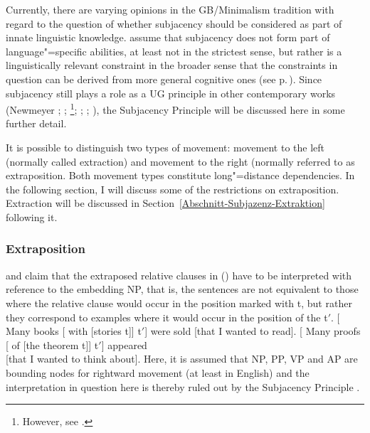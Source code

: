 Currently, there are varying opinions in the GB/Minimalism tradition with regard to the question of whether subjacency should be considered as part of innate linguistic knowledge.
\citet*{HCF2002a} assume that subjacency does not form part of language"=specific abilities, at least not in the strictest sense, but rather is a linguistically relevant constraint
in the broader sense that the constraints in question can be derived from more general cognitive ones (see
p.\,\pageref{Seite-Subjazenz-Performanz}). Since subjacency still plays a role as a UG principle in other contemporary works (Newmeyer \citeyear[, 74--75]{Newmeyer2005a};
\citeyear[]{Newmeyer2004b}; 
\citealp{Baltin2006a}\footnote{
However, see .
}; \citealp{Baker2009a}; \citealp{Freidin2009a}; \citealp{Rizzi2009a,Rizzi2009b-andere-anfuehrungszeichen}), 
the Subjacency Principle will be discussed here in some further detail.

It is possible to distinguish two types of movement: movement to the left (normally called extraction) and movement to the right (normally referred to as
extraposition. Both movement types constitute long"=distance dependencies.
In the following section, I will discuss some of the restrictions on extraposition. Extraction will be discussed in Section~\ref{Abschnitt-Subjazenz-Extraktion} following it.

\subsubsection{Extraposition}

\mbox{}\citet{Baltin81a} and \citet[]{Chomsky86b} claim that the extraposed relative clauses in () have to be interpreted with
reference to the embedding NP, that is, the sentences are not equivalent to those where the relative clause would occur in the position marked with t, but rather
they correspond to examples where it would occur in the position of the t$'$.
\eal
\label{ex-chomsky-sub}
\ex {}[ Many books [ with [stories t]] t$'$]  were sold [that I wanted to read].
\ex {}[ Many proofs [ of [the theorem t]] t$'$] appeared\\
    {}[that I wanted to think about].
\zl
Here, it is assumed that NP, PP, VP and AP are bounding nodes for rightward movement (at least in English) and the interpretation in question here
is thereby ruled out by the Subjacency Principle \citep[]{Baltin81a}. 

